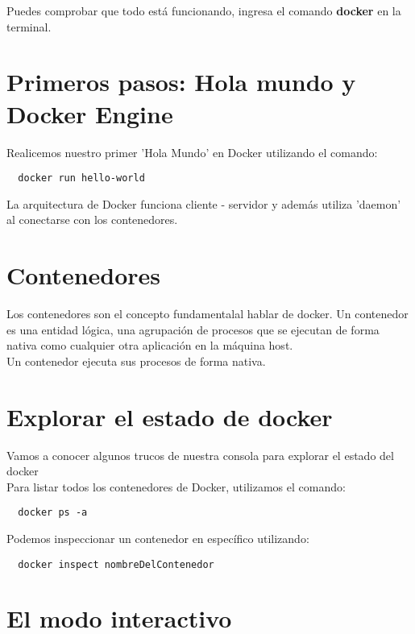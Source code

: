 \documentclass{article}
\begin{document}
Puedes comprobar que todo está funcionando, ingresa el comando \textbf{docker}
en la terminal.

\section{Primeros pasos: Hola mundo y Docker Engine}%
Realicemos nuestro primer 'Hola Mundo' en Docker utilizando el comando:\\

\begin{verbatim}
  docker run hello-world
\end{verbatim}

La arquitectura de Docker funciona cliente - servidor y además utiliza 'daemon'
al conectarse con los contenedores.

\section{Contenedores}%
Los contenedores son el concepto fundamentalal hablar de docker. Un contenedor
es una entidad lógica, una agrupación de procesos que se ejecutan de forma
nativa como cualquier otra aplicación en la máquina host.\\

Un contenedor ejecuta sus procesos de forma nativa.\\


\section{Explorar el estado de docker}%
Vamos a conocer algunos trucos de nuestra consola para explorar el estado del
docker\\

Para listar todos los contenedores de Docker, utilizamos el comando:\\

\begin{verbatim}
  docker ps -a
\end{verbatim}

Podemos inspeccionar un contenedor en específico utilizando:\\

\begin{verbatim}
  docker inspect nombreDelContenedor
\end{verbatim}

\section{El modo interactivo}%
\end{document}
